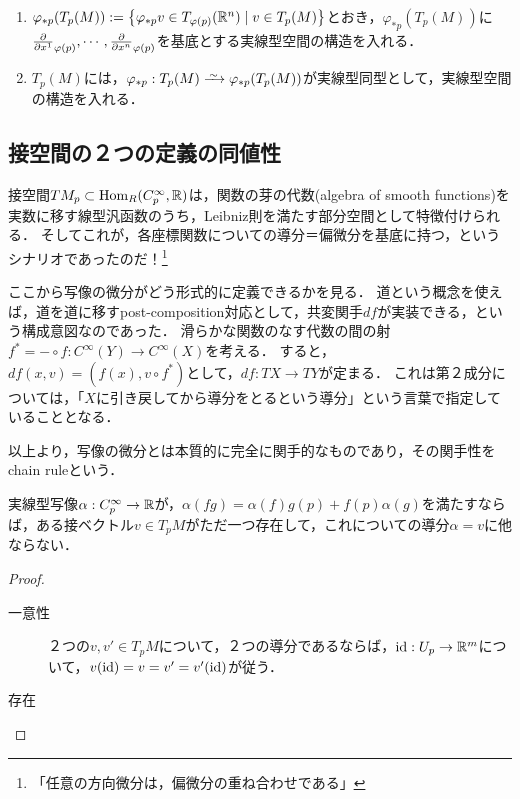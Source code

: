 \documentclass[uplatex,dvipdfmx]{jsreport}
\begin{document}
\begin{definition}[接空間の線型構造]\mbox{}
    \begin{enumerate}
        \item $\varphi_{*p}(T_p(M)):=\left\{\varphi_{*p}v\in T_{\varphi(p)}(\mathbb{R}^n)\mid v\in T_p(M)\right\}$とおき，$\varphi_{*p}(T_p(M))$に$\frac{\partial }{\partial x^1}_{\varphi(p)},\cdots,\frac{\partial }{\partial x^n}_{\varphi(p)}$を基底とする実線型空間の構造を入れる．
        \item $T_p(M)$には，$\varphi_{*p}:T_p(M)\iso\varphi_{*p}(T_p(M))$が実線型同型として，実線型空間の構造を入れる．
    \end{enumerate}
\end{definition}

\subsection{接空間の２つの定義の同値性}

\begin{tcolorbox}[colframe=ForestGreen, colback=ForestGreen!10!white,breakable,colbacktitle=ForestGreen!40!white,coltitle=black,fonttitle=\bfseries\sffamily,
title=導分として構成すると，強固な支持を得る．]
    接空間$TM_p\subset\mathrm{Hom}_R(C_p^\infty,\mathbb{R})$は，関数の芽の代数(algebra of smooth functions)を実数に移す線型汎函数のうち，Leibniz則を満たす部分空間として特徴付けられる．
    そしてこれが，各座標関数についての導分＝偏微分を基底に持つ，というシナリオであったのだ！\footnote{「任意の方向微分は，偏微分の重ね合わせである」}

    ここから写像の微分がどう形式的に定義できるかを見る．
    道という概念を使えば，道を道に移すpost-composition対応として，共変関手$df$が実装できる，という構成意図なのであった．
    滑らかな関数のなす代数の間の射$f^*=-\circ f:C^\infty(Y)\to C^\infty(X)$を考える．
    すると，$df(x,v)=(f(x),v\circ f^*)$として，$df:TX\to TY$が定まる．
    これは第２成分については，「$X$に引き戻してから導分をとるという導分」という言葉で指定していることとなる．

    以上より，写像の微分とは本質的に完全に関手的なものであり，その関手性をchain ruleという．
\end{tcolorbox}

\begin{proposition}
    実線型写像$\alpha:C_p^\infty\to\mathbb{R}$が，$\alpha(fg)=\alpha(f)g(p)+f(p)\alpha(g)$を満たすならば，ある接ベクトル$v\in T_pM$がただ一つ存在して，これについての導分$\alpha=v$に他ならない．
\end{proposition}
\begin{proof}\mbox{}
    \begin{description}
        \item[一意性] ２つの$v,v'\in T_pM$について，２つの導分であるならば，$\mathrm{id}:U_p\to\mathbb{R}^m$について，$v(\mathrm{id})=v=v'=v'(\mathrm{id})$が従う．
        \item[存在] 
    \end{description}
\end{proof}
\end{document}
